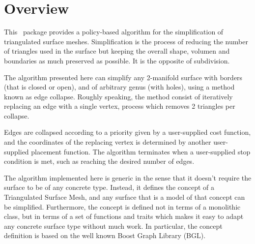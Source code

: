
\section{Overview}

This \cgal\ package provides a policy-based algorithm for the simplification of triangulated surface meshes. Simplification is the process of reducing the number of triangles used in the surface but keeping the overall shape, volumen and boundaries as much preserved as possible. It is the opposite of subdivision.


The algorithm presented here can simplify any 2-manifold surface with borders (that is closed or open), and of arbitrary genus (with holes), using a method known as edge collapse. Roughly speaking, the method consist of iteratively replacing an edge with a single vertex, process which removes 2 triangles per collapse.


Edges are collapsed according to a priority given by a user-supplied cost function, and the coordinates of the replacing vertex is determined by another user-supplied placement function. The algorithm terminates when a user-supplied stop condition is met, such as reaching the desired number of edges.

The algorithm implemented here is generic in the sense that it doesn't require the surface to be of any concrete type. Instead, it defines the concept of a Triangulated Surface Mesh, and any surface that is a model of that concept can be simplified. Furthermore, the concept is defined not in terms of a monolithic class, but in terms of a set of functions and traits which makes it easy to adapt any concrete surface type without much work. In particular, the concept definition is based on the well known Boost Graph Library (BGL).


